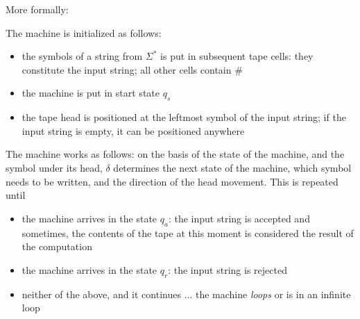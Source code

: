 \vspace{0.5cm} More formally:

The machine is initialized as follows: 
\begin{itemize}
\item the symbols of a string from $\Sigma^*$ is put in subsequent
tape cells: they constitute the input string; all other cells contain
\#
\item the machine is put in start state $q_s$
\item the tape head is positioned at the leftmost symbol of the input
  string; if the input string is empty, it can be positioned anywhere
\end{itemize}

The machine works as follows: on the basis of the state of the
machine, and the symbol under its head, $\delta$ determines the next
state of the machine, which symbol needs to be written, and the
direction of the head movement. This is repeated until
\begin{itemize}
\item the machine arrives in the state $q_a$: the input string is
  accepted and sometimes, the contents of the tape at this moment is
  considered the result of the computation
\item the machine arrives in the state $q_r$: the input string is
 rejected
\item neither of the above, and it continues ... the machine {\em
  loops} or is in an infinite loop
\end{itemize}


